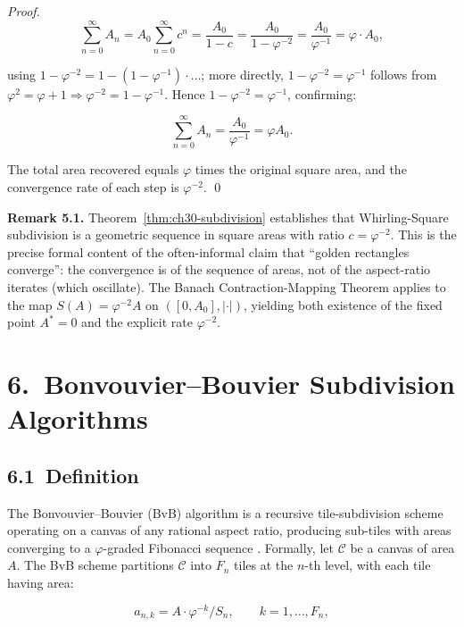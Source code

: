 \begin{proof}
\[\sum_{n=0}^{\infty} A_n
  = A_0 \sum_{n=0}^{\infty} c^n
  = \frac{A_0}{1 - c}
  = \frac{A_0}{1 - \varphi^{-2}}
  = \frac{A_0}{\varphi^{-1}}
  = \varphi \cdot A_0,\]

using $1 - \varphi^{-2} = 1 - (1 - \varphi^{-1}) \cdot\ldots$;
more directly, $1 - \varphi^{-2} = \varphi^{-1}$
follows from $\varphi^2 = \varphi + 1 \Rightarrow
\varphi^{-2} = 1 - \varphi^{-1}$.
Hence $1 - \varphi^{-2} = \varphi^{-1}$, confirming:

\[\sum_{n=0}^{\infty} A_n = \frac{A_0}{\varphi^{-1}} = \varphi A_0.\]

The total area recovered equals $\varphi$ times
the original square area, and the convergence
rate of each step is $\varphi^{-2}$.
\qed
\end{proof}

\noindent\textbf{Remark 5.1.}
Theorem~\ref{thm:ch30-subdivision} establishes
that Whirling-Square subdivision is a
geometric sequence in square areas with ratio
$c = \varphi^{-2}$.  This is the precise formal
content of the often-informal claim that ``golden
rectangles converge'': the convergence is of the
sequence of areas, not of the aspect-ratio
iterates (which oscillate).  The Banach
Contraction-Mapping Theorem applies to the map
$S(A) = \varphi^{-2} A$ on
$([0, A_0], |\cdot|)$, yielding both existence of
the fixed point $A^* = 0$ and the explicit
rate $\varphi^{-2}$.

\section{6.\ Bonvouvier--Bouvier Subdivision
  Algorithms}\label{sec:ch30-bonvouvier}

\subsection{6.1\ Definition}\label{subsec:ch30-bvb-def}

The Bonvouvier--Bouvier (BvB) algorithm is a
recursive tile-subdivision scheme operating on a
canvas of any rational aspect ratio, producing
sub-tiles with areas converging to a
$\varphi$-graded Fibonacci sequence
\cite{stiny_algorithmic_aesthetics}.
Formally, let $\mathcal{C}$ be a canvas of area
$A$.  The BvB scheme partitions $\mathcal{C}$
into $F_{n}$ tiles at the $n$-th level, with each
tile having area:

\[a_{n,k} = A \cdot \varphi^{-k} / S_n,
  \qquad k = 1, \ldots, F_n,\]

